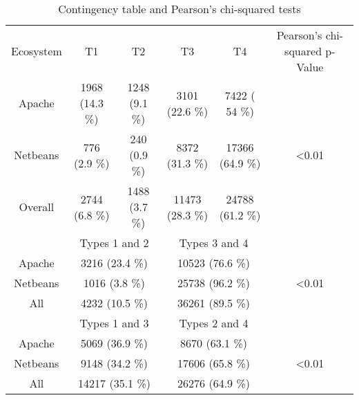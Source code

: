 \begin{table*}[]
\centering
\small
\caption{Contingency table and Pearson's chi-squared tests}
\label{tab:contingency-table}
\begin{tabular}{cccccc}
Ecosystem & T1                 & T2               & T3                & T4                & Pearson's chi-squared p-Value                          \\ \rowcolor{gray!25}
Apache    & 1968  (14.3 \%)   & 1248  (9.1 \%)  & 3101  (22.6 \%)  &7422  ( 54 \%)    &  \\ \rowcolor{gray!25}
Netbeans  & 776  (2.9 \%)     & 240  (0.9 \%)   & 8372  (31.3 \%)  & 17366  (64.9 \%) &  \textless0.01                               \\ \rowcolor{gray!25}
Overall   & 2744  (6.8 \%)    & 1488  (3.7 \%)  & 11473  (28.3 \%) & 24788  (61.2 \%) &                                \\
          & \multicolumn{2}{c}{Types 1 and 2}     & \multicolumn{2}{c}{Types 3 and 4}     &                           \\ \rowcolor{gray!25}
Apache    & \multicolumn{2}{c}{3216  (23.4 \%)}  & \multicolumn{2}{c}{10523  (76.6 \%)} & \\ \rowcolor{gray!25}
Netbeans  & \multicolumn{2}{c}{1016  (3.8 \%)}   & \multicolumn{2}{c}{25738  (96.2 \%)} & \textless0.01                               \\ \rowcolor{gray!25}
All       & \multicolumn{2}{c}{4232  (10.5 \%)}  & \multicolumn{2}{c}{36261  (89.5 \%)} &                                \\
          & \multicolumn{2}{c}{Types 1 and 3}     & \multicolumn{2}{c}{Types 2 and 4}     &                           \\ \rowcolor{gray!25}
Apache    & \multicolumn{2}{c}{5069  (36.9 \%)}  & \multicolumn{2}{c}{8670  (63.1 \%)}  &  \\ \rowcolor{gray!25}
Netbeans  & \multicolumn{2}{c}{9148  (34.2 \%)}  & \multicolumn{2}{c}{17606  (65.8 \%)} &   \textless0.01                             \\ \rowcolor{gray!25}
All       & \multicolumn{2}{c}{14217  (35.1 \%)} & \multicolumn{2}{c}{26276  (64.9 \%)} &
\end{tabular}
\end{table*}
